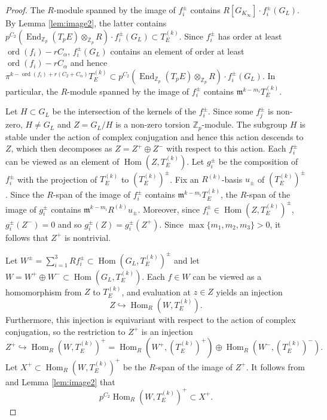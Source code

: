 \documentclass[10pt]{amsart}
\numberwithin{equation}{section}
\theoremstyle{definition}
\theoremstyle{remark}
\newcommand{\Z}{\mathbb{Z}}
\newcommand{\fm}{\mathfrak{m}}
\DeclareMathOperator{\Hom}{Hom}
\DeclareMathOperator{\ord}{ord}
\DeclareMathOperator{\End}{End}
\begin{document}
\begin{proof}
The $R$-module spanned by the image of $f_i^\pm$ contains $R[G_{K_\infty}]\cdot f_i^\pm(G_L)$. 
By Lemma \ref{lem:image2}, the latter contains $p^{C_2}(\End_{\Z_p}(T_pE)\otimes_{\Z_p}R)\cdot f_i^\pm(G_L) \subset T_E^{(k)}$. 
Since $f_i^\pm$ has order at least $\ord(f_i) - rC_\alpha$, $f_i^\pm(G_L)$ contains an element of order at least 
$\ord(f_i) - rC_\alpha$ and hence $\pi^{k-\ord(f_i) + r(C_2+C_\alpha)} T_E^{(k)}\subset 
p^{C_2}(\End_{\Z_p}(T_pE)\otimes_{\Z_p}R)\cdot f_i^\pm(G_L)$.
In particular, the $R$-module spanned by the image of $f_i^\pm$ contains 
$\fm^{k-m_i} T_E^{(k)}$. 


Let $H \subset G_L$ be the intersection of the kernels of the $f_i^\pm$. Since some $f_j^\pm$ is non-zero, $H\neq G_L$
and $Z = G_L/H$ is a non-zero torsion $\Z_p$-module. The subgroup $H$ is stable under the action of complex conjugation and hence this action descends to $Z$, which then decomposes as $Z = Z^+ \oplus Z^-$ with respect to this action.
Each $f_i^\pm$ can be viewed as an element of $\Hom(Z,T_E^{(k)})$.
Let $g_i^\pm$ be the composition of $f_i^\pm$ with the projection of $T_E^{(k)}$ to $(T_E^{(k)})^\pm$.
Fix an $R^{(k)}$-basis $u_\pm$ of $(T_E^{(k)})^\pm$. Since the $R$-span of the image of $f_i^\pm$ contains
$\fm^{k-m_i} T_E^{(k)}$, the $R$-span of the image of $g_i^\pm$ contains $\fm^{k-m_i}R^{(k)} u_\pm$.
Moreover, since $f_i^\pm \in \Hom(Z,T_E^{(k)})^\pm$, $g^\pm_i(Z^-)=0$ and so $g_i^\pm(Z) = g_i^\pm(Z^+)$.
Since $\max\{m_1,m_2,m_3\}>0$, it follows that $Z^+$ is nontrivial.

Let $W^\pm = \sum_{i=1}^3 Rf_i^\pm \subset \Hom(G_L,T_E^{(k)})^\pm$ and let
$W = W^+\oplus W^- \subset \Hom(G_L,T_E^{(k)})$. 
Each $f\in W$ can be viewed as a homomorphism from 
$Z$ to $T_E^{(k)}$, and evaluation at $z\in Z$ yields an injection
$$
Z\hookrightarrow \Hom_R(W,T_E^{(k)}).
$$
Furthermore, this injection is equivariant with respect to the action of complex conjugation, so 
the restriction to $Z^+$ is an injection
$$
Z^+ \hookrightarrow \Hom_R(W,T_E^{(k)})^+ = \Hom_R(W^+,(T_E^{(k)})^+)\oplus \Hom_R(W^-,(T_E^{(k)})^-).
$$
Let $X^+\subset \Hom_R(W,T_E^{(k)})^+$ be the $R$-span of the image of $Z^+$. It follows
from \cite[Cor.~(6.3.4)]{nekovar} and Lemma \ref{lem:image2} that 
\begin{equation}\label{eq:spanimage}
p^{C_2} \Hom_R(W,T_E^{(k)})^+\subset X^+.
\end{equation}


\end{proof}
\end{document}
